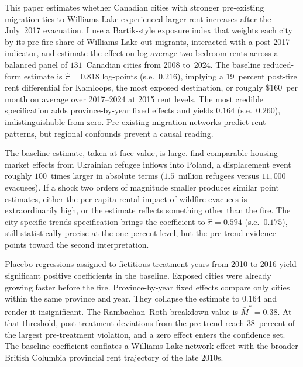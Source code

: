 \documentclass[12pt]{article}
\begin{document}
This paper estimates whether Canadian cities with stronger pre-existing migration ties to
Williams Lake experienced larger rent increases after the July~2017 evacuation. I use a
Bartik-style exposure index that weights each city by its pre-fire share of Williams Lake
out-migrants, interacted with a post-2017 indicator, and estimate the effect on log
average two-bedroom rents across a balanced panel of $131$~Canadian cities from 2008
to~2024. The baseline reduced-form estimate is $\hat{\pi} = 0.818$ log-points
(s.e.\ $0.216$), implying a $19$~percent post-fire rent differential for Kamloops, the
most exposed destination, or roughly \$160~per month on average over 2017--2024 at 2015 rent levels. The most
credible specification adds province-by-year fixed effects and yields $0.164$
(s.e.\ $0.260$), indistinguishable from zero. Pre-existing migration networks predict
rent patterns, but regional confounds prevent a causal reading.

The baseline estimate, taken at face value, is large. \citet{trojanek2022} find
comparable housing market effects from Ukrainian refugee inflows into Poland, a displacement event
roughly $100$~times larger in absolute terms ($1.5$~million refugees versus $11{,}000$
evacuees). If a shock two orders of magnitude smaller produces similar point estimates,
either the per-capita rental impact of wildfire evacuees is extraordinarily high, or the
estimate reflects something other than the fire. The city-specific trends specification
brings the coefficient to $\hat{\pi} = 0.594$ (s.e.\ $0.175$), still statistically
precise at the one-percent level, but the pre-trend evidence points toward the second
interpretation.

Placebo regressions assigned to fictitious treatment years from 2010 to 2016 yield
significant positive coefficients in the baseline. Exposed cities were already growing
faster before the fire. Province-by-year fixed effects compare only cities within the
same province and year. They collapse the estimate to $0.164$ and render it
insignificant. The Rambachan--Roth breakdown value is $\bar{M}^{*}=0.38$.
At that threshold, post-treatment deviations from the pre-trend reach $38$~percent
of the largest pre-treatment violation, and a zero effect enters the confidence set.
The baseline coefficient conflates a Williams Lake network effect with the broader
British Columbia provincial rent trajectory of the late 2010s.
\end{document}
